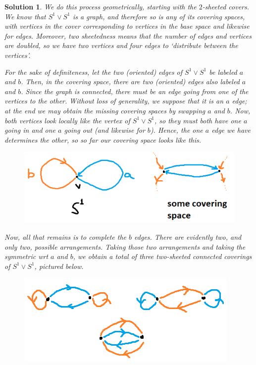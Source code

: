 \documentclass{article}
\theoremstyle{plain}
\theoremstyle{nonumberplain}
\newtheorem{sol}{Solution}
\begin{document}
\begin{sol}
We do this process geometrically, starting with the $2$-sheeted covers. We know that $S^1 \vee S^1$ is a graph, and therefore so is any of its covering spaces, with vertices in the cover corresponding to vertices in the base space and likewise for edges. Moreover, two sheetedness means that the number of edges and vertices are doubled, so we have two vertices and four edges to `distribute between the vertices'.

For the sake of definiteness, let the two (oriented) edges of $S^1 \vee S^1$ be labeled $a$ and $b$. Then, in the covering space, there are two (oriented) edges also labeled $a$ and $b$. Since the graph is connected, there must be an edge going from one of the vertices to the other. Without loss of generality, we suppose that it is an $a$ edge; at the end we may obtain the missing covering spaces by swapping $a$ and $b$. Now, both vertices look locally like the vertex of $S^1 \vee S^1$, so they must both have one $a$ going in and one $a$ going out (and likewise for $b$). Hence, the one $a$ edge we have determines the other, so so far our covering space looks like this.
\begin{figure}[H]
\centering
\includegraphics{cov1}
\end{figure}

Now, all that remains is to complete the $b$ edges. There are evidently two, and only two, possible arrangements. Taking those two arrangements and taking the symmetric wrt $a$ and $b$, we obtain a total of three two-sheeted connected coverings of $S^1 \vee S^1$, pictured below.
\begin{figure}[H]
\centering
\includegraphics{cov2}
\end{figure}


\end{sol}
\end{document}
